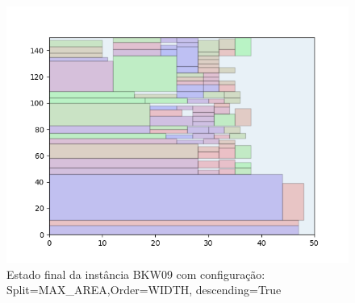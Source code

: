 \begin{figure}[H]
    \centering
    \caption[]{Estado final da instância BKW09 com configuração: Split=MAX_AREA,Order=WIDTH, descending=True}
    \label{fig:bkw09-max_area-width-true}
    \includegraphics[scale=0.5]{output/figures/bkw/bkw09/max_area/width/true/000}
\end{figure}